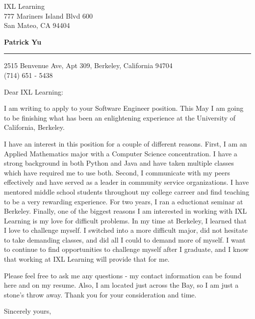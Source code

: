 \documentclass{letter} %
\begin{document}
\signature{Patrick Yu}           %
\longindentation=0pt                       %
\let\raggedleft\raggedright                %
 
 
\begin{letter}{
IXL Learning\\
777 Mariners Island Blvd 600\\
San Mateo, CA 94404}

\begin{flushleft}
{\large\bf Patrick Yu}
\end{flushleft}
\medskip\hrule height 1pt
\begin{flushright}
\hfill 2515 Benvenue Ave, Apt 309, Berkeley, California 94704 \\
\hfill (714) 651 - 5438
\end{flushright} 
\vfill %

 
\opening{Dear IXL Learning:} 
 
\noindent I am writing to apply to your Software Engineer position. This May I am going to be finishing what has been an enlightening experience at the University of California, Berkeley.

\noindent I have an interest in this position for a couple of different reasons. First, I am an Applied Mathematics major with a Computer Science concentration. I have a strong background in both Python and Java and have taken multiple classes which have required me to use both.  Second, I communicate with my peers effectively and have served as a leader in community service organizations.  I have mentored middle school students throughout my college carreer and find teaching to be a very rewarding experience.  For two years, I ran a eductionat seminar at Berkeley.  Finally, one of the biggest reasons I am interested in working with IXL Learning is my love for difficult problems. In my time at Berkeley, I learned that I love to challenge myself. I switched into a more difficult major, did not hesitate to take demanding classes, and did all I could to demand more of myself. I want to continue to find opportunities to challenge myself after I graduate, and I know that working at IXL Learning will provide that for me.

\noindent Please feel free to ask me any questions - my contact information can be found here and on my resume. Also, I am located just across the Bay, so I am just a stone's throw away. Thank you for your consideration and time.
 
\closing{Sincerely yours,} 
 

 

\end{letter}
 
\end{document}
